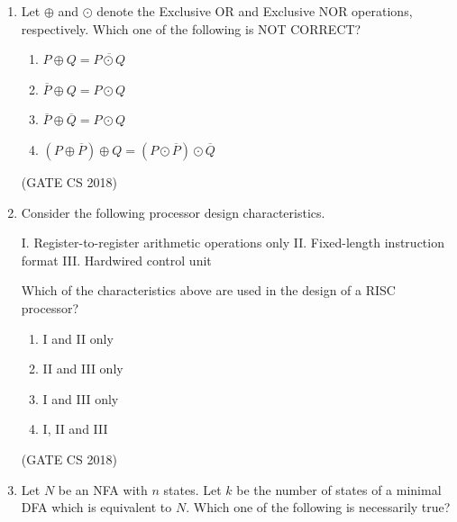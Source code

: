 \documentclass[12pt]{article}
\begin{document}
\begin{enumerate}
Which one of the following is the time complexity of the most time-efficient implementation of \texttt{enqueue} and \texttt{dequeue}, respectively, for this data structure?

\begin{multicols}{4}
\begin{enumerate}
\item $\theta(1), \theta(1)$
\item $\theta(1), \theta(n)$
\item $\theta(n), \theta(1)$
\item $\theta(n), \theta(n)$
\end{enumerate}
\end{multicols}
(GATE CS 2018)

\item Let $\oplus$ and $\odot$ denote the Exclusive OR and Exclusive NOR operations, respectively.  
Which one of the following is NOT CORRECT?

\begin{enumerate}
\item $P \oplus Q = \overline{P \odot Q}$
\item $\overline{P} \oplus Q = P \odot Q$
\item $\overline{P} \oplus \overline{Q} = P \odot Q$
\item $(P \oplus \overline{P}) \oplus Q = (P \odot \overline{P}) \odot \overline{Q}$
\end{enumerate}
(GATE CS 2018)

\item Consider the following processor design characteristics.  

I. Register-to-register arithmetic operations only  
II. Fixed-length instruction format  
III. Hardwired control unit  

Which of the characteristics above are used in the design of a RISC processor?

\begin{multicols}{4}
\begin{enumerate}
\item I and II only
\item II and III only
\item I and III only
\item I, II and III
\end{enumerate}
\end{multicols}
(GATE CS 2018)

\item Let $N$ be an NFA with $n$ states. Let $k$ be the number of states of a minimal DFA which is equivalent to $N$. Which one of the following is necessarily true?


\end{enumerate}
\end{document}
